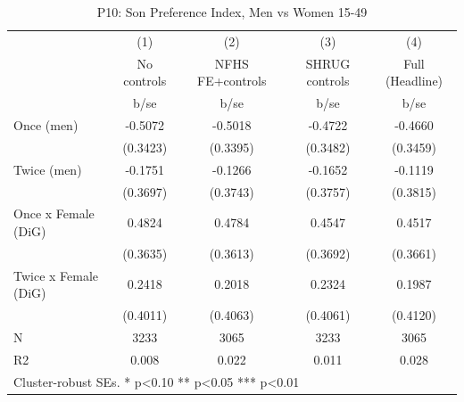 \begin{table}[htbp]\centering
\def\sym#1{\ifmmode^{#1}\else\(^{#1}\)\fi}
\caption{P10: Son Preference Index, Men vs Women 15-49}
\begin{tabular}{l*{4}{c}}
\toprule
            &\multicolumn{1}{c}{(1)}   &\multicolumn{1}{c}{(2)}   &\multicolumn{1}{c}{(3)}   &\multicolumn{1}{c}{(4)}   \\
            & No controls   &NFHS FE+controls   &SHRUG controls   &Full (Headline)   \\
            &        b/se   &        b/se   &        b/se   &        b/se   \\
\midrule
Once (men)  &     -0.5072   &     -0.5018   &     -0.4722   &     -0.4660   \\
            &    (0.3423)   &    (0.3395)   &    (0.3482)   &    (0.3459)   \\
Twice (men) &     -0.1751   &     -0.1266   &     -0.1652   &     -0.1119   \\
            &    (0.3697)   &    (0.3743)   &    (0.3757)   &    (0.3815)   \\
Once x Female (DiG)&      0.4824   &      0.4784   &      0.4547   &      0.4517   \\
            &    (0.3635)   &    (0.3613)   &    (0.3692)   &    (0.3661)   \\
Twice x Female (DiG)&      0.2418   &      0.2018   &      0.2324   &      0.1987   \\
            &    (0.4011)   &    (0.4063)   &    (0.4061)   &    (0.4120)   \\
\midrule
N           &        3233   &        3065   &        3233   &        3065   \\
R2          &       0.008   &       0.022   &       0.011   &       0.028   \\
\bottomrule
\multicolumn{5}{l}{\footnotesize Cluster-robust SEs. * p<0.10 ** p<0.05 *** p<0.01}\\
\end{tabular}
\end{table}
